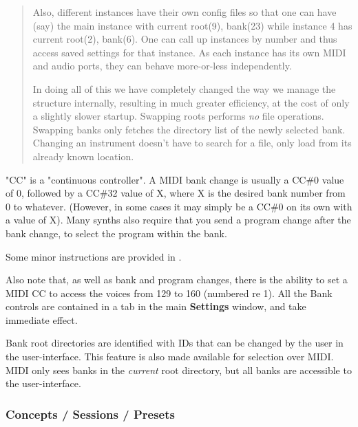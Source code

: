 \begin{quotation}
      Also, different instances have their own config files so that one can
      have (say) the main instance with current root(9), bank(23) while
      instance 4 has current root(2), bank(6). One can call up instances by
      number and thus access saved settings for that instance. As each
      instance has its own MIDI and audio ports, they can behave
      more-or-less independently.

      In doing all of this we have completely changed the way we manage the
      structure internally, resulting in much greater efficiency, at the
      cost of only a slightly slower startup. Swapping roots performs
      \textsl{no}
      file operations. Swapping banks only fetches the directory list of the
      newly selected bank. Changing an instrument doesn't have to search for
      a file, only load from its already known location.
   \end{quotation}

   "CC" is a "continuous controller".
   A MIDI bank change is usually a CC\#0 value of 0, followed by a CC\#32
   value of X, where X is the desired bank number from 0 to whatever.
   (However, in some cases it may simply be a CC\#0 on its own with a value
    of X).  Many synths also require that you send a program change after
   the bank change, to select the program within the bank. 


   Some minor instructions are provided in
   .

   Also note that, as well as bank and program changes, there is the ability
   to set a MIDI CC to access the voices from 129 to 160 (numbered re 1).
   All the Bank
   controls are contained in a tab in the main \textbf{Settings}
   window, and take immediate effect.

   Bank root directories are identified with IDs that can be changed by the
   user in the user-interface. This feature is also made available for
   selection over MIDI.  MIDI only sees banks in the \textsl{current} root
   directory, but all banks are accessible to the user-interface.

\subsubsection{Concepts / Sessions / Presets}
\label{subsec:concepts_sessions_presets}

